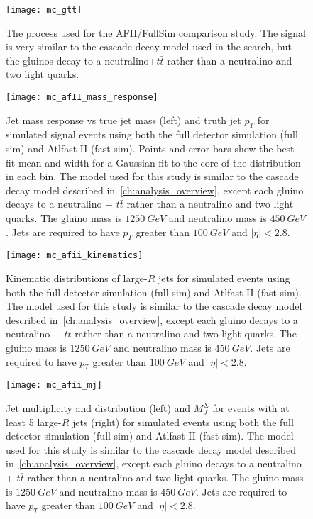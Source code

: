 \begin{figure}[!ht]\centering
    \texttt{[image: mc\_gtt]}
    \caption{The process used for the AFII/FullSim comparison study.
    The signal is very similar to the cascade decay model used in the search, but the gluinos decay to a neutralino+$t\bar{t}$ rather than a neutralino and two light quarks.}
    \label{fig:mc_gtt}
\end{figure}

\begin{figure}[!ht]\centering
    \texttt{[image: mc\_afII\_mass\_response]}
    \caption{Jet mass response vs true jet mass (left) and truth jet $p_{T}$ for simulated signal events using both the full detector simulation (full sim) and Atlfast-II (fast sim).
    Points and error bars show the best-fit mean and width for a Gaussian fit to the core of the distribution in each bin.
    The model used for this study is similar to the cascade decay model described in~\ref{ch:analysis_overview}, except each gluino decays to a neutralino + $t\bar{t}$ rather than a neutralino and two light quarks.
    The gluino mass is $1250~GeV$ and neutralino mass is $450~GeV$.
    Jets are required to have $p_{T}$ greater than $100~GeV$ and $|\eta|<2.8$.
    }
    \label{fig:afii_mass_response}
\end{figure}

\begin{figure}[!ht]\centering
    \texttt{[image: mc\_afii\_kinematics]}
    \caption{Kinematic distributions of large-$R$ jets for simulated events using both the full detector simulation (full sim) and Atlfast-II (fast sim).
    The model used for this study is similar to the cascade decay model described in~\ref{ch:analysis_overview}, except each gluino decays to a neutralino + $t\bar{t}$ rather than a neutralino and two light quarks.
    The gluino mass is $1250~GeV$ and neutralino mass is $450~GeV$.
    Jets are required to have $p_{T}$ greater than $100~GeV$ and $|\eta|<2.8$.
    }
    \label{fig:afii_kinematics}
\end{figure}

\begin{figure}[!ht]\centering
    \texttt{[image: mc\_afii\_mj]}
    \caption{Jet multiplicity and distribution (left) and $M_{J}^{\Sigma}$ for events with at least 5 large-$R$ jets (right) for simulated events using both the full detector simulation (full sim) and Atlfast-II (fast sim).
    The model used for this study is similar to the cascade decay model described in~\ref{ch:analysis_overview}, except each gluino decays to a neutralino + $t\bar{t}$ rather than a neutralino and two light quarks.
    The gluino mass is $1250~GeV$ and neutralino mass is $450~GeV$.
    Jets are required to have $p_{T}$ greater than $100~GeV$ and $|\eta|<2.8$.}
    \label{fig:afii_mj}
\end{figure}


